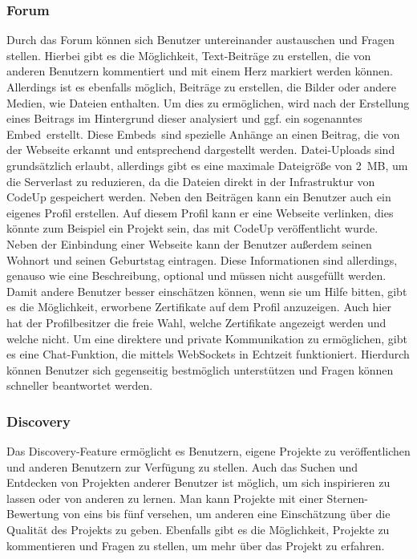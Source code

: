 \documentclass[main.tex]{subfiles}
\begin{document}
    \subsubsection{Forum}
    Durch das Forum können sich Benutzer untereinander austauschen und Fragen stellen.
    Hierbei gibt es die Möglichkeit, Text-Beiträge zu erstellen, die von anderen Benutzern kommentiert und mit einem Herz markiert werden können.
    Allerdings ist es ebenfalls möglich, Beiträge zu erstellen, die Bilder oder andere Medien, wie Dateien enthalten.
    Um dies zu ermöglichen, wird nach der Erstellung eines Beitrags im Hintergrund dieser analysiert und ggf. ein sogenanntes \dq Embed\dq\ erstellt.
    Diese \dq Embeds\dq\ sind spezielle Anhänge an einen Beitrag, die von der Webseite erkannt und entsprechend dargestellt werden.
    Datei-Uploads sind grundsätzlich erlaubt, allerdings gibt es eine maximale Dateigröße von 2~MB, um die Serverlast zu reduzieren, da die Dateien direkt in der Infrastruktur von CodeUp gespeichert werden.
    Neben den Beiträgen kann ein Benutzer auch ein eigenes Profil erstellen.
    Auf diesem Profil kann er eine Webseite verlinken, dies könnte zum Beispiel ein Projekt sein, das mit CodeUp veröffentlicht wurde.
    Neben der Einbindung einer Webseite kann der Benutzer außerdem seinen Wohnort und seinen Geburtstag eintragen.
    Diese Informationen sind allerdings, genauso wie eine Beschreibung, optional und müssen nicht ausgefüllt werden.
    Damit andere Benutzer besser einschätzen können, wenn sie um Hilfe bitten, gibt es die Möglichkeit, erworbene Zertifikate auf dem Profil anzuzeigen.
    Auch hier hat der Profilbesitzer die freie Wahl, welche Zertifikate angezeigt werden und welche nicht.
    Um eine direktere und private Kommunikation zu ermöglichen, gibt es eine Chat-Funktion, die mittels WebSockets in Echtzeit funktioniert.
    Hierdurch können Benutzer sich gegenseitig bestmöglich unterstützen und Fragen können schneller beantwortet werden.
    \subsubsection{Discovery}
    Das Discovery-Feature ermöglicht es Benutzern, eigene Projekte zu veröffentlichen und anderen Benutzern zur Verfügung zu stellen.
    Auch das Suchen und Entdecken von Projekten anderer Benutzer ist möglich, um sich inspirieren zu lassen oder von anderen zu lernen.
    Man kann Projekte mit einer Sternen-Bewertung von eins bis fünf versehen, um anderen eine Einschätzung über die Qualität des Projekts zu geben.
    Ebenfalls gibt es die Möglichkeit, Projekte zu kommentieren und Fragen zu stellen, um mehr über das Projekt zu erfahren.
\end{document}
